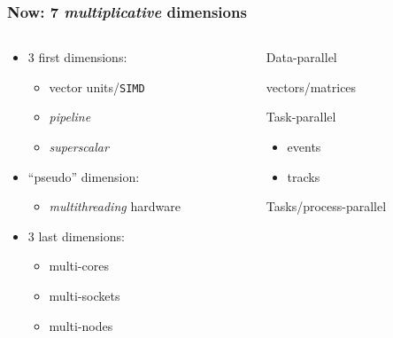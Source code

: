 \documentclass[9pt]{beamer}
\begin{document}
\begin{frame}
  \frametitle{Now: 7 \emph{multiplicative} dimensions}

  \begin{columns}
    \begin{column}{0.5\textwidth}

      \begin{itemize}
      \item \alert{3} first dimensions:
        \begin{itemize}
        \item vector units/\texttt{SIMD}
        \item \emph{pipeline}
        \item \emph{superscalar}
        \end{itemize}
      \item ``pseudo'' dimension:
        \begin{itemize}
        \item \emph{multithreading} hardware
        \end{itemize}
      \item \alert{3} last dimensions:
        \begin{itemize}
        \item multi-cores
        \item multi-sockets
        \item multi-nodes
        \end{itemize}
      \end{itemize}
    \end{column}

    \begin{column}{0.5\textwidth}
      \begin{block}{Data-parallel}

        vectors/matrices
      \end{block}
      \begin{block}{Task-parallel}
        \begin{itemize}
        \item events
        \item tracks
        \end{itemize}
      \end{block}
      \begin{block}{Tasks/process-parallel}
      \end{block}
    \end{column}
  \end{columns}
\end{frame}
\end{document}
